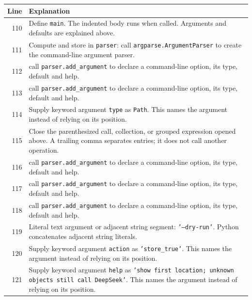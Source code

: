 \documentclass[11pt,a4paper]{book}
\begin{document}
\begin{longtable}{r p{}}

\textbf{Line} & \textbf{Explanation} \\ \hline \endhead

110 & Define \texttt{main}. The indented body runs when called. Arguments and defaults are explained above. \\

111 & Compute and store in \texttt{parser}: call \texttt{argparse.ArgumentParser} to create the command-line argument parser.  \\

112 & call \texttt{parser.add\_argument} to declare a command-line option, its type, default and help. \\

113 & call \texttt{parser.add\_argument} to declare a command-line option, its type, default and help. \\

114 & Supply keyword argument \texttt{type} as \texttt{Path}. This names the argument instead of relying on its position. \\

115 & Close the parenthesized call, collection, or grouped expression opened above. A trailing comma separates entries; it does not call another operation. \\

116 & call \texttt{parser.add\_argument} to declare a command-line option, its type, default and help. \\

117 & call \texttt{parser.add\_argument} to declare a command-line option, its type, default and help. \\

118 & call \texttt{parser.add\_argument} to declare a command-line option, its type, default and help. \\

119 & Literal text argument or adjacent string segment: \texttt{'--dry-run'}. Python concatenates adjacent string literals. \\

120 & Supply keyword argument \texttt{action} as \texttt{'store\_true'}. This names the argument instead of relying on its position. \\

121 & Supply keyword argument \texttt{help} as \texttt{'show first location; unknown objects still call DeepSeek'}. This names the argument instead of relying on its position. \\


\end{longtable}
\end{document}
